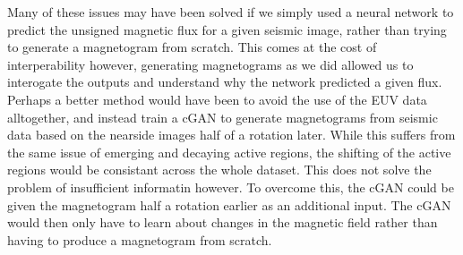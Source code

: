\documentclass[11pt,a4paper,onecolumn]{report}
\begin{document}
Many of these issues may have been solved if we simply used a neural network to
predict the unsigned magnetic flux for a given seismic image, rather than trying
to generate a magnetogram from scratch. This comes at the cost of
interperability however, generating magnetograms as we did allowed us to
interogate the outputs and understand why the network predicted a given flux.
Perhaps a better method would have been to avoid the use of the EUV data
alltogether, and instead train a cGAN to generate magnetograms from seismic data
based on the nearside images half of a rotation later. While this suffers from
the same issue of emerging and decaying active regions, the shifting of the
active regions would be consistant across the whole dataset. This does not solve
the problem of insufficient informatin however. To overcome this, the cGAN could
be given the magnetogram half a rotation earlier as an additional input. The
cGAN would then only have to learn about changes in the magnetic field rather
than having to produce a magnetogram from scratch. \\






\end{document}
